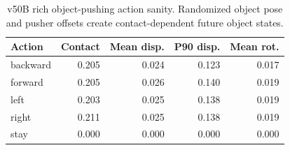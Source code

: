 \begin{table}[t]
\centering
\small
\begin{tabular}{lrrrr}
\toprule
Action & Contact & Mean disp. & P90 disp. & Mean rot. \\
\midrule
backward & 0.205 & 0.024 & 0.123 & 0.017 \\
forward & 0.205 & 0.026 & 0.140 & 0.019 \\
left & 0.203 & 0.025 & 0.138 & 0.019 \\
right & 0.211 & 0.025 & 0.138 & 0.019 \\
stay & 0.000 & 0.000 & 0.000 & 0.000 \\
\bottomrule
\end{tabular}
\caption{v50B rich object-pushing action sanity. Randomized object pose and pusher offsets create contact-dependent future object states.}
\label{tab:v50b_rich_object_pushing_action_sanity}
\end{table}
